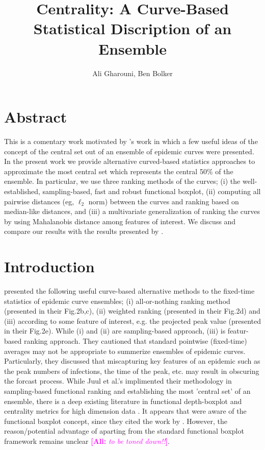 \documentclass[12pt]{article}
\title{Centrality: A Curve-Based Statistical Discription of an Ensemble}
\author{Ali Gharouni, Ben Bolker}
\newcommand{\comment}{\showcomment}
\newcommand{\showcomment}[3]{\textcolor{#1}{\textbf{[#2: }\textsl{#3}\textbf{]}}}
\newcommand{\ali}[1]{\comment{magenta}{Ali}{#1}}
\theoremstyle{definition} %
\begin{document}
\maketitle
\linenumbers

\section{Abstract}
This is a comentary work motivated by \cite{juul2021fixed}'s work in which a few useful ideas of the concept of the central set out of an ensemble of epidemic curves were presented. In the present work we provide alternative curved-based statistics approaches to approximate the most central set which represents the central 50\% of the ensemble. In particular, we use three ranking methods of the curves; (i) the well-established, sampling-based, fast and robust functional boxplot, (ii) computing all pairwise distances (eg, $\ell_2$ norm) between the curves and ranking based on median-like distances, and (iii) a multivariate generalization of ranking the curves by using Mahalanobis distance among features of interest. We discuss and compare our results with the results presented by \cite{juul2021fixed}.      

\section{Introduction}

\cite{juul2021fixed} presented the following useful curve-based alternative methods to the fixed-time statistics of epidemic curve ensembles; (i) all-or-nothing ranking method (presented in their Fig.2b,c), (ii) weighted ranking (presented in their Fig.2d) and (iii) according to some feature of interest, e.g. the projected peak value (presented in their Fig.2e). While (i) and (ii) are sampling-based approach, (iii) is featur-based ranking approach. They cautioned that standard pointwise (fixed-time) averages may not be appropriate to summerize ensembles of epidemic curves. Particularly, they discussed that miscapturing key features of an epidemic such as the peak numbers of infections, the time of the peak, etc. may result in obscuring the forcast process. While Juul et al.'s implimented their methodology in sampling-based functional ranking and establishing the most 'central set' of an ensemble, there is a deep existing literature in functional depth-boxplot and centrality metrics for high dimension data \citep{fraiman2001trimmed, lopez2007depth, lopez2009concept, sun2011functional,sun2012exact}. It appears that \cite{juul2021fixed} were aware of the functional boxplot concept, since they cited the work by \cite{sun2011functional}. However, the reason/potential advantage of aparting from the standard functional boxplot framework remains unclear \ali{to be toned down!!}.  
\end{document}

